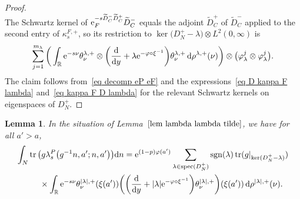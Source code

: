 \documentclass[pdftex]{sigma}%
\numberwithin{equation}{section}
\newtheorem{Lemma}[Theorem]{Lemma}
\DeclareMathOperator{\tr}{tr}
\DeclareMathOperator{\spec}{spec}
\DeclareMathOperator{\sgn}{sgn}
\newcommand{\R}{\mathbb{R}}
\begin{document}
\begin{proof}
\begin{equation}
\end{equation}
The Schwartz kernel of $ {\rm e}_F^{-s \widetilde{D}_C^- \widetilde{D}_C^{+} }\widetilde{D}_C^{-}$ equals the adjoint $\widetilde{D}_C^+$ of $\widetilde{D}_C^-$ applied to the second entry of $\kappa_s^{F, +}$, so its restriction to $\ker\big(D_N^+ - \lambda\big) \otimes L^2(0, \infty)$ is
\begin{equation} \label{eq kappa F D lambda}
\sum_{j=1}^{m_{\lambda}}\bigg(\int_{\R}
{\rm e}^{-s\nu} \theta^{\lambda, +}_{\nu}\otimes \bigg( \frac{\rm d}{{\rm d}y}+\lambda {\rm e}^{-\varphi \circ \xi^{-1}}\bigg) \theta^{\lambda, +}_{\nu} \, {\rm d}\rho^{\lambda, +}(\nu)\bigg) \otimes \big(\varphi_{\lambda}^j \otimes \varphi_{\lambda}^j \big).
\end{equation}
The claim follows from~\eqref{eq decomp eP eF} and the expressions~\eqref{eq D kappa F lambda} and~\eqref{eq kappa F D lambda} for the relevant Schwartz kernels on eigenspaces of $D_N^+$.
\end{proof}

\begin{Lemma}\label{lem kernel on diagonal}
In the situation of Lemma~$\ref{lem lambda lambda tilde}$, we have for all $a'>a$,
\begin{gather}
\int_N \tr\big( g \lambda_s^{P}\big(g^{-1}n, a'; n, a'\big) \big) {\rm d}n
 = {\rm e}^{(1-p)\varphi(a')}\sum_{\lambda \in \spec(D_N^+)}\sgn(\lambda)\tr(g|_{\ker(D_N^+ - \lambda)}) \nonumber
 \\ \qquad
 {}\times
\int_{\R}
{\rm e}^{-s\nu} \theta^{|\lambda|, +}_{\nu} (\xi(a')) \bigg( \bigg( \frac{\rm d}{{\rm d}y}+|\lambda| {\rm e}^{-\varphi \circ \xi^{-1}}\bigg) \theta^{|\lambda|, +}_{\nu} \bigg)(\xi(a'))\,{\rm d}\rho^{|\lambda|, +}(\nu) .
\label{eq kernel on diagonal}
\end{gather}
\end{Lemma}
\end{document}
